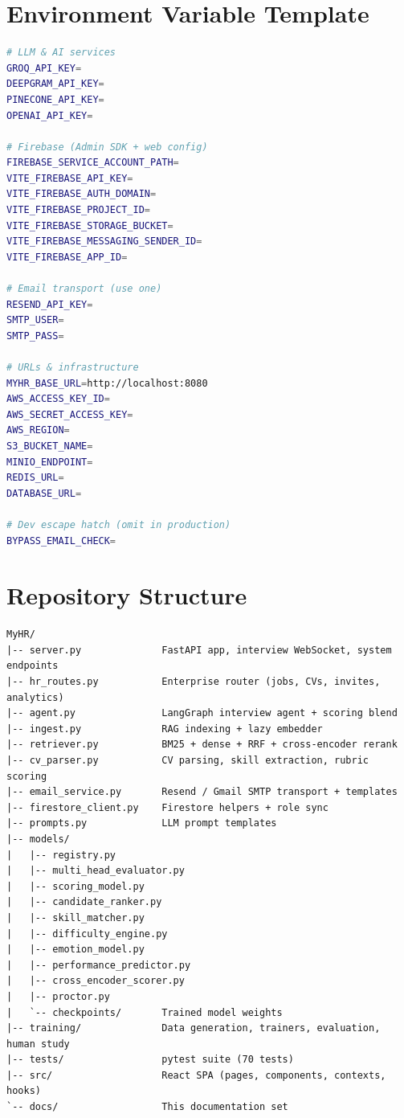 \documentclass[12pt,a4paper,oneside]{report}
\begin{document}
\appendix

\chapter{Environment Variable Template}
\label{app:env}

\begin{lstlisting}[language=bash, caption={.env template}]
# LLM & AI services
GROQ_API_KEY=
DEEPGRAM_API_KEY=
PINECONE_API_KEY=
OPENAI_API_KEY=

# Firebase (Admin SDK + web config)
FIREBASE_SERVICE_ACCOUNT_PATH=
VITE_FIREBASE_API_KEY=
VITE_FIREBASE_AUTH_DOMAIN=
VITE_FIREBASE_PROJECT_ID=
VITE_FIREBASE_STORAGE_BUCKET=
VITE_FIREBASE_MESSAGING_SENDER_ID=
VITE_FIREBASE_APP_ID=

# Email transport (use one)
RESEND_API_KEY=
SMTP_USER=
SMTP_PASS=

# URLs & infrastructure
MYHR_BASE_URL=http://localhost:8080
AWS_ACCESS_KEY_ID=
AWS_SECRET_ACCESS_KEY=
AWS_REGION=
S3_BUCKET_NAME=
MINIO_ENDPOINT=
REDIS_URL=
DATABASE_URL=

# Dev escape hatch (omit in production)
BYPASS_EMAIL_CHECK=
\end{lstlisting}

\chapter{Repository Structure}
\label{app:repo}

\begin{lstlisting}[caption={Selected repository structure}]
MyHR/
|-- server.py              FastAPI app, interview WebSocket, system endpoints
|-- hr_routes.py           Enterprise router (jobs, CVs, invites, analytics)
|-- agent.py               LangGraph interview agent + scoring blend
|-- ingest.py              RAG indexing + lazy embedder
|-- retriever.py           BM25 + dense + RRF + cross-encoder rerank
|-- cv_parser.py           CV parsing, skill extraction, rubric scoring
|-- email_service.py       Resend / Gmail SMTP transport + templates
|-- firestore_client.py    Firestore helpers + role sync
|-- prompts.py             LLM prompt templates
|-- models/
|   |-- registry.py
|   |-- multi_head_evaluator.py
|   |-- scoring_model.py
|   |-- candidate_ranker.py
|   |-- skill_matcher.py
|   |-- difficulty_engine.py
|   |-- emotion_model.py
|   |-- performance_predictor.py
|   |-- cross_encoder_scorer.py
|   |-- proctor.py
|   `-- checkpoints/       Trained model weights
|-- training/              Data generation, trainers, evaluation, human study
|-- tests/                 pytest suite (70 tests)
|-- src/                   React SPA (pages, components, contexts, hooks)
`-- docs/                  This documentation set
\end{lstlisting}
\end{document}
